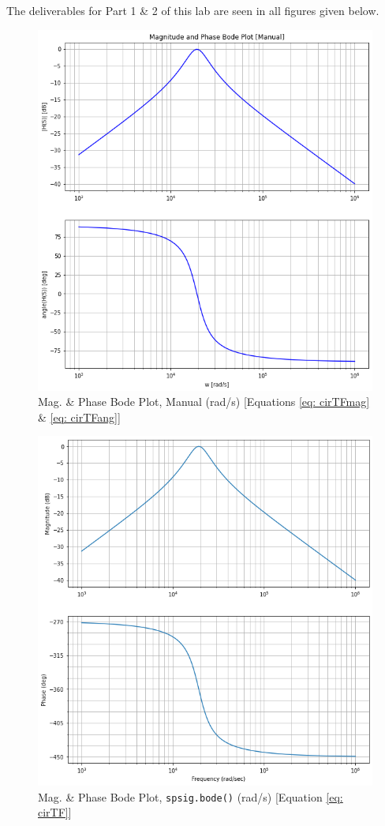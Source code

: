 \documentclass[12pt]{report}
\begin{document}
The deliverables for Part 1 \& 2 of this lab are seen in all figures given below.
\\
\begin{figure}[h!]
  \centering
  \includegraphics[width=\linewidth]{p1t1.png}
  \caption{Mag. \& Phase Bode Plot, Manual (rad/s) [Equations \eqref{eq: cirTFmag} \& \eqref{eq: cirTFang}]}
  \label{fig: p1t1}
\end{figure}
\begin{figure}[h!]
  \centering
  \includegraphics[width=\linewidth]{p1t2.png}
  \caption{Mag. \& Phase Bode Plot, \texttt{spsig.bode()} (rad/s) [Equation \eqref{eq: cirTF}]}
  \label{fig: p1t2}
\end{figure}
\end{document}
